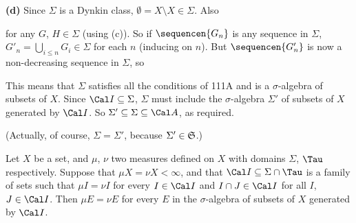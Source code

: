 {\medskip

{\bf (d)} Since $\Sigma$ is a Dynkin class,
$\emptyset=X\setminus X\in\Sigma$.   Also


\noindent for any $G$, $H\in\Sigma$ (using (c)).
So if $\sequencen{G_n}$ is any sequence in $\Sigma$,
$G'_n=\bigcup_{i\le n}G_i\in\Sigma$ for each $n$ (inducing on $n$).
But $\sequencen{G'_n}$
is now a non-decreasing sequence in $\Sigma$, so


This means that $\Sigma$ satisfies all the conditions of 111A and is a
$\sigma$-algebra of subsets of $X$.   Since $\Cal I\subseteq\Sigma$,
$\Sigma$ must include the $\sigma$-algebra $\Sigma'$ of subsets of $X$
generated by $\Cal I$.   So $\Sigma'\subseteq\Sigma\subseteq\Cal A$, as
required.

(Actually, of course, $\Sigma=\Sigma'$, because $\Sigma'\in\frak S$.)
}%


 Let $X$ be a set, and $\mu$, $\nu$ two measures
defined on $X$ with domains $\Sigma$, $\Tau$ respectively.   Suppose
that $\mu X=\nu X<\infty$, and that $\Cal I\subseteq\Sigma\cap\Tau$ is a
family of sets such that $\mu I=\nu I$ for every $I\in\Cal I$ and
$I\cap J\in\Cal I$ for all $I$, $J\in\Cal I$.   Then $\mu E=\nu E$ for
every $E$ in the $\sigma$-algebra of subsets of $X$ generated by
$\Cal I$.


